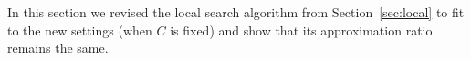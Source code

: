 In this section we revised the local search algorithm from
Section~\ref{sec:local} to fit to the new settings (when $C$ is fixed) and show
that its approximation ratio remains the same.
